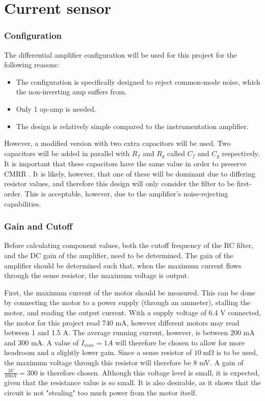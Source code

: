 \graphicspath{{content/2_design/figures/}}
\section{Current sensor}\label{sec:current_sensor_design}
\subsubsection{Configuration}\label{sec:current_sensor_config}

The differential amplifier configuration will be used for this project for the following reasons:
\begin{itemize}
  \item The configuration is specifically designed to reject common-mode noise, which the non-inverting amp suffers from.
  \item Only 1 op-amp is needed.
  \item The design is relatively simple compared to the instrumentation amplifier.
\end{itemize}

However, a modified version with two extra capacitors will be used. Two capacitors will be added in parallel with $R_f$ and $R_g$ called $C_f$ and $C_g$ respectively. It is important that these capacitors have the same
value in order to preserve CMRR \cite{opAmpConfigurations}. It is likely, however, that one of these will be dominant due to differing resistor values, and therefore this design will only consider the filter to be first-order.
This is acceptable, however, due to the amplifier's noise-rejecting capabilities.

\subsubsection{Gain and Cutoff}
Before calculating component values, both the cutoff frequency of the RC filter, and the DC gain of the amplifier, need to be determined. The gain of the amplifier should be determined
such that, when the maximum current flows through the sense resistor, the maximum voltage is output.

First, the maximum current of the motor should be measured. This can be done by connecting the motor to a power supply (through an ammeter), stalling the motor, and reading the output current.
With a supply voltage of 6.4 V connected, the motor for this project read 740 mA, however different motors may read between 1 and 1.5 A. The average running current, however, is between 200 mA
and 300 mA. A value of $I_{max} = 1 A$ will therefore be chosen to allow for more headroom and a slightly lower gain.
Since a sense resistor of $\SI{10}{\milli\ohm}$ is to be used, the maximum voltage through this resistor will therefore be 8 mV. A gain of $\frac{3 V}{10 mV} = 300$ is therefore chosen.
Although this voltage level is small, it is expected, given that the resistance value is so small. It is also desirable, as it shows that the circuit is not "stealing" too much power from the motor itself.

